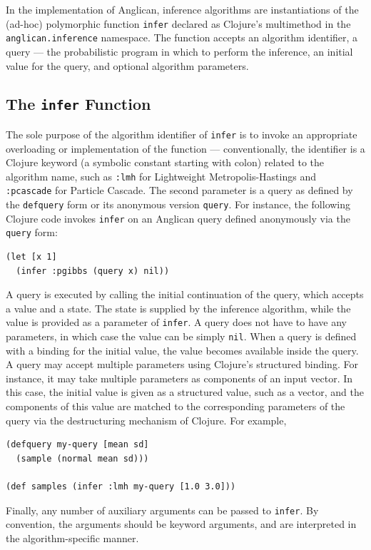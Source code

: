 \documentclass[preprint]{sigplanconf}
\begin{document}
In the implementation of Anglican, inference algorithms are
instantiations of the (ad-hoc) polymorphic function
\texttt{infer} declared as Clojure's multimethod in the
\texttt{anglican.{\linebreak[0]}inference} namespace. The function accepts an
algorithm identifier, a query --- the probabilistic program in
which to perform the inference, an initial value for the query,
and optional algorithm parameters.

\subsection{The \texttt{infer} Function}
\label{sec:infer}

The sole purpose of the algorithm identifier of \texttt{infer} is to invoke
an appropriate overloading or implementation of the function --- conventionally,
the identifier is a Clojure keyword (a symbolic constant starting with colon)
related to the algorithm name, such as \texttt{:lmh} for Lightweight
Metropolis-Hastings and \texttt{:pcascade} for Particle Cascade.
The second parameter is a query as defined by
the \texttt{defquery} form or its anonymous version \texttt{query}. For instance,
the following Clojure code invokes \texttt{infer} on an Anglican query
defined anonymously via the \texttt{query} form:
\begin{lstlisting}[style=default]
(let [x 1]
  (infer :pgibbs (query x) nil))
\end{lstlisting}
A query is executed by calling the initial continuation of the
query, which accepts a value and a state. The state is supplied
by the inference algorithm, while the value is provided as a
parameter of \texttt{infer}. A query does not have to have any
parameters, in which case the value can be simply \texttt{nil}.
When a query is defined with a binding for the initial value,
the value becomes available inside the query. A query may
accept multiple parameters using Clojure's structured binding.
For instance, it may take multiple parameters as components
of an input vector. In this case, the initial value is given
as a structured value, such as a vector, and the components
of this value are matched to the corresponding
parameters of the query via the destructuring mechanism of Clojure.
For example,
\begin{lstlisting}[style=default]
(defquery my-query [mean sd]
  (sample (normal mean sd)))

(def samples (infer :lmh my-query [1.0 3.0]))
\end{lstlisting}
Finally, any number of auxiliary arguments can be
passed to \texttt{infer}.
By convention, the arguments should be
keyword arguments, and are interpreted in the algorithm-specific
manner.
\end{document}
